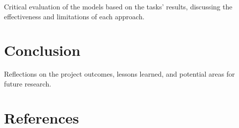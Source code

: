 \documentclass[12pt]{article} \usepackage{COSC420style} \usepackage{soul}
\begin{document}
Critical evaluation of the models based on the tasks' results, discussing the effectiveness and
limitations of each approach.

\section{Conclusion}

Reflections on the project outcomes, lessons learned, and potential areas for future research.

\section{References}
\end{document}
